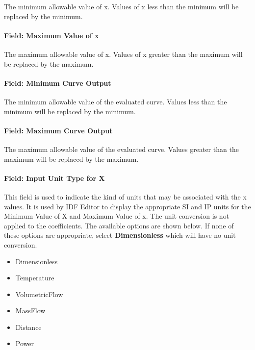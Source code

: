 The minimum allowable value of x. Values of x less than the minimum will be replaced by the minimum.

\paragraph{Field: Maximum Value of x}\label{field-maximum-value-of-x-6}

The maximum allowable value of x. Values of x greater than the maximum will be replaced by the maximum.

\paragraph{Field: Minimum Curve Output}\label{field-minimum-curve-output-4}

The minimum allowable value of the evaluated curve. Values less than the minimum will be replaced by the minimum.

\paragraph{Field: Maximum Curve Output}\label{field-maximum-curve-output-3}

The maximum allowable value of the evaluated curve. Values greater than the maximum will be replaced by the maximum.

\paragraph{Field: Input Unit Type for X}\label{field-input-unit-type-for-x-5}

This field is used to indicate the kind of units that may be associated with the x values. It is used by IDF Editor to display the appropriate SI and IP units for the Minimum Value of X and Maximum Value of x. The unit conversion is not applied to the coefficients. The available options are shown below. If none of these options are appropriate, select \textbf{Dimensionless} which will have no unit conversion.

\begin{itemize}
\item
  Dimensionless
\item
  Temperature
\item
  VolumetricFlow
\item
  MassFlow
\item
  Distance
\item
  Power
\end{itemize}

